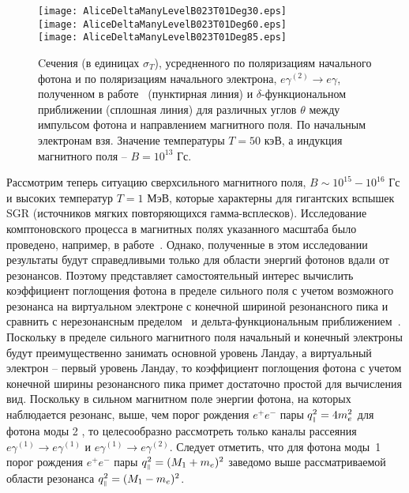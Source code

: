 \clearpage
\begin{figure}[t!]\centering
	\texttt{[image: AliceDeltaManyLevelB023T01Deg30.eps]}\\
	\texttt{[image: AliceDeltaManyLevelB023T01Deg60.eps]}\\
	\texttt{[image: AliceDeltaManyLevelB023T01Deg85.eps]}
	\caption{Cечения (в единицах $\sigma_T$), усредненного по поляризациям начального фотона и по поляризациям начального электрона, $e\gamma^{(2)}  \to e\gamma$, полученном в работе~\cite{Harding:1991} (пунктирная линия) и $\delta$-функциональном приближении (сплошная линия) для различных углов $\theta$ между импульсом фотона и направлением магнитного поля. По начальным электронам взя. Значение температуры $T=50$ кэВ, а индукция магнитного поля -- $B=10^{13}$ Гс.\label{fig:HardingManyLevels}}
\end{figure}
\clearpage

Рассмотрим теперь ситуацию сверхсильного магнитного поля, \mbox{$B\sim 
10^{15}-10^{16}$} Гс и высоких температур $T=1$ МэВ, которые характерны для 
гигантских вспышек SGR (источников мягких повторяющихся гамма-всплесков).  
Исследование комптоновского процесса в магнитных полях указанного масштаба было 
проведено, например, в работе~\cite{Chistyakov:2009}. Однако, полученные в этом 
исследовании результаты будут справедливыми только для области энергий фотонов 
вдали от резонансов. Поэтому представляет самостоятельный интерес вычислить 
коэффициент поглощения фотона в пределе сильного поля с учетом возможного 
резонанса на виртуальном электроне с конечной шириной резонансного пика и 
сравнить с нерезонансным пределом~\cite{Chistyakov:2009} и 
дельта-функциональным приближением~\cite{Rumyantsev:2017}. Поскольку в пределе 
сильного магнитного поля начальный и конечный электроны будут преимущественно 
занимать основной уровень Ландау, а виртуальный электрон -- первый уровень 
Ландау, то коэффициент поглощения фотона с учетом конечной ширины резонансного 
пика примет достаточно простой для вычисления вид. Поскольку в сильном 
магнитном поле энергии фотона, на которых наблюдается резонанс, 
выше, чем порог рождения $e^+e^-$ пары $q_{\mbox{\tiny $\|$}}^2=4m_e^2$ для фотона моды 2 , 
то целесообразно рассмотреть только каналы рассеяния $e\gamma^{(1)}\to 
e\gamma^{(1)}$ и $e\gamma^{(1)}\to e\gamma^{(2)}$. Следует отметить, что для 
фотона моды~1 порог рождения $e^+e^-$ пары $q_{\mbox{\tiny $\|$}}^2=(M_1+m_e)^2$ заведомо 
выше рассматриваемой области резонанса $q_{\mbox{\tiny $\|$}}^2=(M_1-m_e)^2$.


